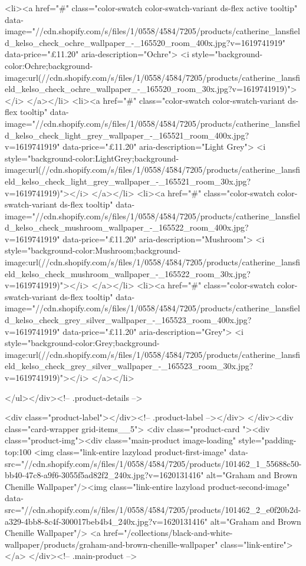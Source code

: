 {{{{{{{<li><a href="#" class="color-swatch color-swatch-variant ds-flex active tooltip" data-image="//cdn.shopify.com/s/files/1/0558/4584/7205/products/catherine_lansfield_kelso_check_ochre_wallpaper_-_165520_room_400x.jpg?v=1619741919" data-price="£11.20" aria-description="Ochre">
              <i style="background-color:Ochre;background-image:url(//cdn.shopify.com/s/files/1/0558/4584/7205/products/catherine_lansfield_kelso_check_ochre_wallpaper_-_165520_room_30x.jpg?v=1619741919)"></i>
            </a></li>
<li><a href="#" class="color-swatch color-swatch-variant ds-flex tooltip" data-image="//cdn.shopify.com/s/files/1/0558/4584/7205/products/catherine_lansfield_kelso_check_light_grey_wallpaper_-_165521_room_400x.jpg?v=1619741919" data-price="£11.20" aria-description="Light Grey">
              <i style="background-color:LightGrey;background-image:url(//cdn.shopify.com/s/files/1/0558/4584/7205/products/catherine_lansfield_kelso_check_light_grey_wallpaper_-_165521_room_30x.jpg?v=1619741919)"></i>
            </a></li>
<li><a href="#" class="color-swatch color-swatch-variant ds-flex tooltip" data-image="//cdn.shopify.com/s/files/1/0558/4584/7205/products/catherine_lansfield_kelso_check_mushroom_wallpaper_-_165522_room_400x.jpg?v=1619741919" data-price="£11.20" aria-description="Mushroom">
              <i style="background-color:Mushroom;background-image:url(//cdn.shopify.com/s/files/1/0558/4584/7205/products/catherine_lansfield_kelso_check_mushroom_wallpaper_-_165522_room_30x.jpg?v=1619741919)"></i>
            </a></li>
<li><a href="#" class="color-swatch color-swatch-variant ds-flex tooltip" data-image="//cdn.shopify.com/s/files/1/0558/4584/7205/products/catherine_lansfield_kelso_check_grey_silver_wallpaper_-_165523_room_400x.jpg?v=1619741919" data-price="£11.20" aria-description="Grey">
              <i style="background-color:Grey;background-image:url(//cdn.shopify.com/s/files/1/0558/4584/7205/products/catherine_lansfield_kelso_check_grey_silver_wallpaper_-_165523_room_30x.jpg?v=1619741919)"></i>
            </a></li>

      </ul></div><!-- .product-details -->

<div class="product-label"></div><!-- .product-label --></div>
          </div><div class="card-wrapper grid-items__5">
            <div class="product-card "><div class="product-img"><div class="main-product image-loading" style="padding-top:100%
      <img class="link-entire lazyload product-first-image" data-src="//cdn.shopify.com/s/files/1/0558/4584/7205/products/101462_1_55688c50-bb40-47c8-a9f6-3055f5ad82f2_240x.jpg?v=1620131416" alt="Graham and Brown Chenille Wallpaper"/><img class="link-entire lazyload product-second-image" data-src="//cdn.shopify.com/s/files/1/0558/4584/7205/products/101462_2_e0f20b2d-a329-4bb8-8c4f-300017beb4b4_240x.jpg?v=1620131416" alt="Graham and Brown Chenille Wallpaper"/>
      <a href="/collections/black-and-white-wallpaper/products/graham-and-brown-chenille-wallpaper" class="link-entire"></a>
    </div><!-- .main-product -->
  
}}}}}}}
